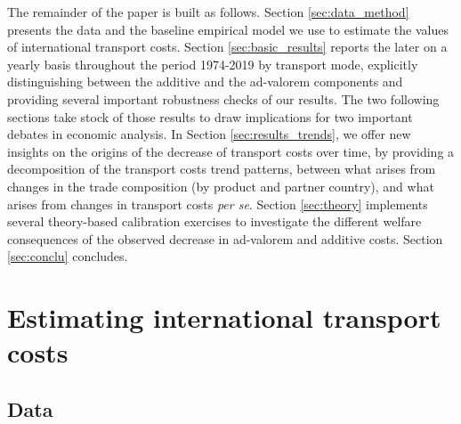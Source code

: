 \documentclass[a4paper,11pt]{article}
\begin{document}
The remainder of the paper is built as follows. Section \ref{sec:data_method} presents the data and the baseline empirical model we use to estimate the values of international transport costs. Section \ref{sec:basic_results} reports the later on a yearly basis throughout the period 1974-2019 by transport mode, explicitly distinguishing between the additive and the ad-valorem components and providing several important robustness checks of our results. The two following sections take stock of those results to draw implications for two important debates in economic analysis. In Section \ref{sec:results_trends}, we offer new insights on the origins of the decrease of transport costs over time, by providing a decomposition of the transport costs trend patterns, between what arises from changes in the trade composition (by product and partner country), and what arises from changes in transport costs \textit{per se}. Section \ref{sec:theory} implements several theory-based calibration exercises to investigate the different welfare consequences of the observed decrease in ad-valorem and additive costs. Section \ref{sec:conclu} concludes.



\section{Estimating international transport costs\label{sec:data_method}}

\subsection{Data}
\end{document}
